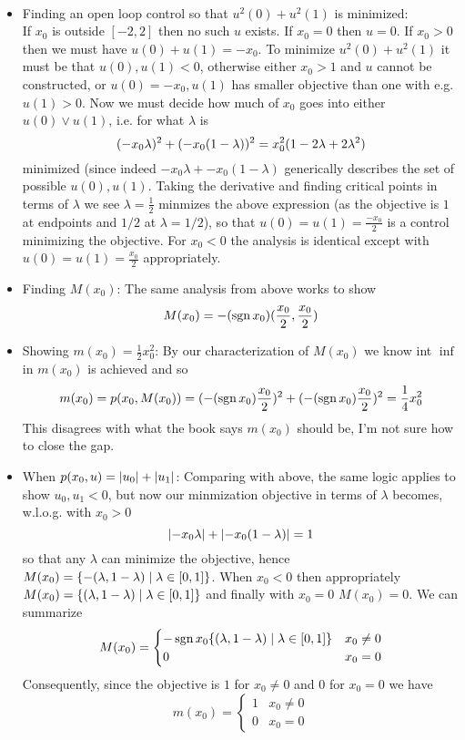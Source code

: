 \documentclass{article}
\newenvironment{ex}[1]
  {\renewcommand\theexercise{#1}\exercise}
  {\endexercise}
\DeclareMathOperator*{\sgn}{sgn}
\begin{document}
\begin{ex}{2.20} \, \\
  \begin{itemize}
    \item Finding an open loop control so that $u^2(0) + u^2(1)$ is minimized: \, \\
      If $x_0$ is outside $[-2, 2]$ then no such $u$ exists. If $x_0 = 0$ then $u = 0$. If $x_0 > 0$ then we must have $u(0) + u(1) = -x_0$. To minimize $u^2(0) + u^2(1)$ it must be that $u(0), u(1) < 0$, otherwise either $x_0 > 1$ and $u$ cannot be constructed, or $u(0) = -x_0, u(1)$ has smaller objective than one with e.g. $u(1) > 0$. Now we must decide how much of $x_0$ goes into either $u(0) \lor u(1)$, i.e. for what $\lambda$ is
      $$
      (-x_0\lambda)^2 + (-x_0(1-\lambda))^2 = x_0^2 (1 - 2\lambda + 2\lambda^2)
      $$
      minimized (since indeed $-x_0\lambda + -x_0(1-\lambda)$ generically describes the set of possible $u(0), u(1)$. Taking the derivative and finding critical points in terms of $\lambda$ we see $\lambda = \frac{1}{2}$ minmizes the above expression (as the objective is $1$ at endpoints and $1/2$ at $\lambda = 1/2$), so that $u(0) = u(1) = \frac{-x_0}{2}$ is a control minimizing the objective. For $x_0 < 0$ the analysis is identical except with $u(0) = u(1) = \frac{x_0}{2}$ appropriately.
    \item Finding $M(x_0)$: The same analysis from above works to show
      $$
      M(x_0) = -(\sgn x_0)\parens{\frac{x_0}{2}, \frac{x_0}{2}}
      $$
    \item Showing $m(x_0) = \frac{1}{2}x_0^2$: By our characterization of $M(x_0)$ we know int $\inf$ in $m(x_0)$ is achieved and so
      $$
      m(x_0) = p(x_0, M(x_0)) = \parens{-(\sgn x_0)\frac{x_0}{2}}^2 + \parens{-(\sgn x_0)\frac{x_0}{2}}^2 = \frac{1}{4}x_0^2
      $$
      This disagrees with what the book says $m(x_0)$ should be, I'm not sure how to close the gap.
    \item When $p(x_0, u) = \lvert u_0\rvert + \lvert u_1\rvert$: Comparing with above, the same logic applies to show $u_0, u_1 < 0$, but now our minmization objective in terms of $\lambda$ becomes, w.l.o.g. with $x_0 > 0$
      $$
      \lvert-x_0 \lambda\rvert + \lvert-x_0(1-\lambda)\rvert = 1
      $$
      so that any $\lambda$ can minimize the objective, hence $M(x_0) = \{ -(\lambda, 1-\lambda) \mid \lambda \in [0, 1] \}$. When $x_0 < 0$ then appropriately $M(x_0) = \{ (\lambda, 1-\lambda) \mid \lambda \in [0, 1] \}$ and finally with $x_0 = 0$ $M(x_0) = {0}$. We can summarize
      $$
      M(x_0) = \begin{cases}
        -\sgn x_0 \braces{ (\lambda, 1-\lambda) \mid \lambda \in [0, 1] } & x_0 \ne 0 \\
        {0} & x_0 = 0
      \end{cases}
      $$
      Consequently, since the objective is $1$ for $x_0 \ne 0$ and $0$ for $x_0 = 0$ we have
      $$
      m(x_0) = \begin{cases}
        1 & x_0 \ne 0 \\
        0 & x_0 = 0
      \end{cases}
      $$
  \end{itemize}
\end{ex}
\end{document}
